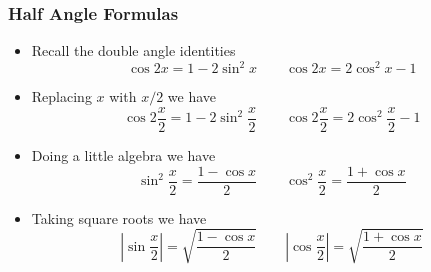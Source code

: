 \documentclass[serif,ignorenonframetext]{beamer}
\begin{document}
\begin{frame}
  \frametitle{Half Angle Formulas}
  \begin{itemize}[<+->]
  \item Recall the double angle identities
    \begin{equation*}
      \cos 2x = 1 -2\sin^2 x \qquad \cos 2x = 2\cos^2 x -1
    \end{equation*}
  \item Replacing $x$ with $x/2$ we have
    \begin{equation*}
      \cos 2\frac{x}{2} = 1-2\sin^2 \frac{x}{2} \qquad
      \cos 2\frac{x}{2} = 2\cos^2 \frac{x}{2} - 1
    \end{equation*}
  \item Doing a little algebra we have
    \begin{equation*}
      \sin^2 \frac{x}{2} = \frac{1-\cos x}{2}
      \qquad
      \cos^2 \frac{x}{2} = \frac{1+\cos x}{2}
    \end{equation*}
  \item Taking square roots we have
    \begin{equation*}
      \left| \sin \frac{x}{2} \right| = \sqrt{\frac{1-\cos x}{2}}
      \qquad
      \left| \cos \frac{x}{2} \right| = \sqrt{\frac{1+\cos x}{2}}
    \end{equation*}
  \end{itemize}
\end{frame}
\end{document}
